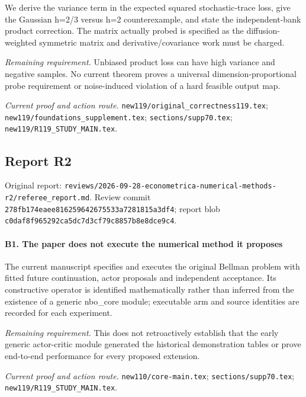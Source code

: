 We derive the variance term in the expected squared stochastic-trace loss, give the Gaussian h=2/3 versus h=2 counterexample, and state the independent-bank product correction. The matrix actually probed is specified as the diffusion-weighted symmetric matrix and derivative/\allowbreak{}covariance work must be charged.

\par\emph{Remaining requirement.} Unbiased product loss can have high variance and negative samples. No current theorem proves a universal dimension-proportional probe requirement or noise-induced violation of a hard feasible output map.

\par\emph{Current proof and action route.} \nolinkurl{new119/original_correctness119.tex}; \nolinkurl{new119/foundations_supplement.tex}; \nolinkurl{sections/supp70.tex}; \nolinkurl{new119/R119_STUDY_MAIN.tex}.

\subsection{Report R2}

Original report: \nolinkurl{reviews/2026-09-28-econometrica-numerical-methods-r2/referee_report.md}. Review commit \nolinkurl{278fb174eaee816259642675533a7281815a3df4}; report blob \nolinkurl{c0daf8f965292ca5dc7d3cf79c8857b8e8dce9c4}.

\paragraph{B1. The paper does not execute the numerical method it proposes}

The current manuscript specifies and executes the original Bellman problem with fitted future continuation, actor proposals and independent acceptance. Its constructive operator is identified mathematically rather than inferred from the existence of a generic nbo\_core module; executable arm and source identities are recorded for each experiment.

\par\emph{Remaining requirement.} This does not retroactively establish that the early generic actor-critic module generated the historical demonstration tables or prove end-to-end performance for every proposed extension.

\par\emph{Current proof and action route.} \nolinkurl{new110/core-main.tex}; \nolinkurl{sections/supp70.tex}; \nolinkurl{new119/R119_STUDY_MAIN.tex}.

